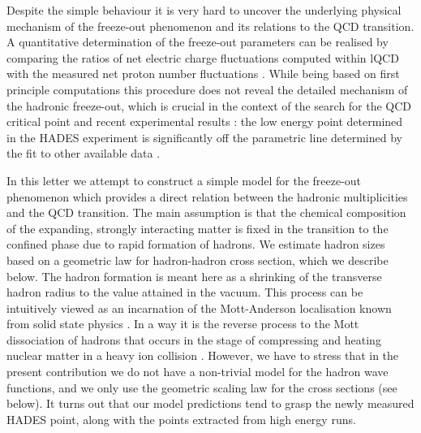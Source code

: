 \documentclass[12pt]{article}
\begin{document}
Despite the simple behaviour it is very hard to uncover the underlying physical mechanism of the freeze-out phenomenon and its relations to the QCD transition.  
A quantitative determination of the freeze-out parameters can be realised by comparing the ratios of net electric charge fluctuations computed within lQCD \cite{Bazavov:2012vg} with the measured net proton number fluctuations \cite{Aggarwal:2010wy}.
While being based on first principle computations this procedure does not reveal the detailed mechanism of the hadronic freeze-out, which is crucial in the context of the search for the QCD critical point and  recent experimental results \cite{HADES}:
the low energy point determined in the HADES experiment is significantly off the parametric line determined by the fit to other available data \cite{Cleymans:2005xv}.
	
In this letter we attempt to construct a simple model for the freeze-out phenomenon which provides a direct relation between the hadronic multiplicities and the QCD transition. 
The main assumption is that the chemical composition of the expanding, strongly interacting matter is fixed in the transition to the confined phase due to rapid formation of hadrons. 
We estimate hadron sizes based on a geometric law for hadron-hadron cross section, which we describe below. 
The hadron formation is meant here as a shrinking of the transverse hadron radius to the value attained in the vacuum.
This process can be intuitively viewed as an incarnation of the Mott-Anderson localisation known from solid state physics \cite{MOTT:1968zz}.
In a way it is the reverse process to the Mott dissociation of hadrons that occurs in the stage of compressing and heating nuclear matter in a heavy ion collision \cite{Satz:1983jp,Blaschke:1984yj}. 
However, we have to stress that in the present contribution we do not have a non-trivial model for the hadron wave functions, and we only use the geometric scaling law for the cross sections (see below).
It turns out that our model predictions tend to grasp the newly measured HADES point, along with the points extracted from high energy runs.
	
\end{document}
